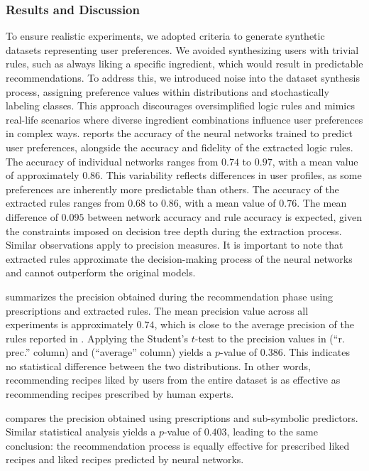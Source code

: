 \subsubsection{Results and Discussion}\label{subsubsec:results-and-discussion}
%
To ensure realistic experiments, we adopted criteria to generate synthetic datasets representing user preferences.
%
We avoided synthesizing users with trivial rules, such as always liking a specific ingredient, which would result in predictable recommendations.
%
To address this, we introduced noise into the dataset synthesis process, assigning preference values within distributions and stochastically labeling classes.
%
This approach discourages oversimplified logic rules and mimics real-life scenarios where diverse ingredient combinations influence user preferences in complex ways.
%
 reports the accuracy of the neural networks trained to predict user preferences, alongside the accuracy and fidelity of the extracted logic rules.
%
The accuracy of individual networks ranges from \(0.74\) to \(0.97\), with a mean value of approximately \(0.86\).
%
This variability reflects differences in user profiles, as some preferences are inherently more predictable than others.
%
The accuracy of the extracted rules ranges from \(0.68\) to \(0.86\), with a mean value of \(0.76\).
%
The mean difference of \(0.095\) between network accuracy and rule accuracy is expected, given the constraints imposed on decision tree depth during the extraction process.
%
Similar observations apply to precision measures.
%
It is important to note that extracted rules approximate the decision-making process of the neural networks and cannot outperform the original models.

 summarizes the precision obtained during the recommendation phase using prescriptions and extracted rules.
%
The mean precision value across all experiments is approximately \(0.74\), which is close to the average precision of the rules reported in .
%
Applying the Student's \(t\)-test to the precision values in  (``r. prec.'' column) and  (``average'' column) yields a \(p\)-value of \(0.386\).
%
This indicates no statistical difference between the two distributions.
%
In other words, recommending recipes liked by users from the entire dataset is as effective as recommending recipes prescribed by human experts.

 compares the precision obtained using prescriptions and sub-symbolic predictors.
%
Similar statistical analysis yields a \(p\)-value of \(0.403\), leading to the same conclusion: the recommendation process is equally effective for prescribed liked recipes and liked recipes predicted by neural networks.

